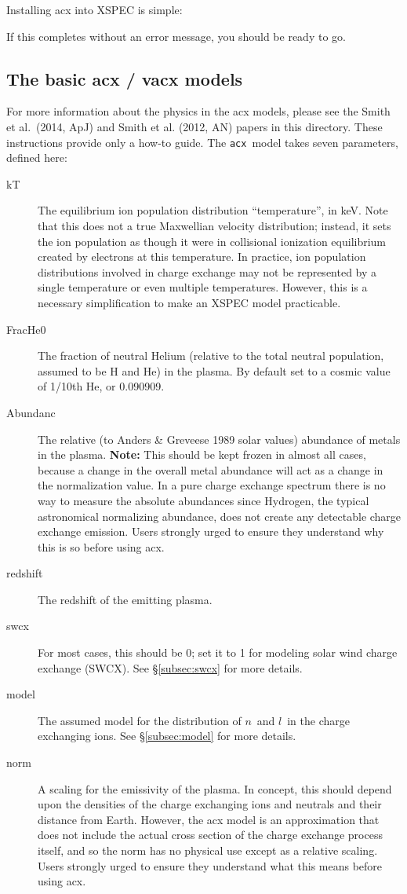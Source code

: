 \documentclass[11pt]{article}
\newcommand{\version}{1.0.2}
\begin{document}
Installing acx into XSPEC is simple:

\noindent {\tt XSPEC$>$\ lmod acx /path/to/acx-\version/xspec}

If this completes without an error message, you should be ready to go.

\subsection*{The basic acx / vacx models}

For more information about the physics in the acx models, please see
the Smith et al.\ (2014, ApJ) and Smith et al. (2012, AN) papers in
this directory.  These 
instructions provide only a how-to guide.  The {\tt acx}\ model takes
seven parameters, defined here:
\begin{description}
\item[kT] The equilibrium ion population distribution ``temperature'',
  in keV.  Note that this does not a true Maxwellian velocity
  distribution; instead, it sets the ion population as though it were
  in collisional ionization equilibrium created by electrons at this
  temperature.  In practice, ion population distributions involved in
  charge exchange may not be represented by a single temperature or
  even multiple temperatures.  However, this is a necessary
  simplification to make an XSPEC model practicable.  
\item[FracHe0] The fraction of neutral Helium (relative to the total
  neutral population, assumed to be H and He) in the plasma.  By
  default set to a cosmic value of 1/10th He, or 0.090909.
\item[Abundanc] The relative (to Anders \& Greveese 1989 solar values)
  abundance of metals in the plasma.  {\bf Note:} This should be kept
  frozen in almost all cases, because a change in the overall metal
  abundance will act as a change in the normalization value.  In a
  pure charge exchange spectrum there is no way to measure the
  absolute abundances since Hydrogen, the typical astronomical
  normalizing abundance, does not create any detectable charge
  exchange emission.  Users strongly urged to ensure they understand
  why this is so before using acx.
\item[redshift] The redshift of the emitting plasma.  
\item[swcx] For most cases, this should be 0; set it to 1 for modeling
  solar wind charge exchange (SWCX).  See \S\ref{subsec:swcx} for more details.
\item[model] The assumed model for the distribution of $n$\ and $l$\
  in the charge exchanging ions.  See \S\ref{subsec:model} for more details.
\item[norm] A scaling for the emissivity of the plasma.  In concept,
  this should depend upon the densities of the charge exchanging ions
  and neutrals and their distance from Earth.  However, the acx model
  is an approximation that does not include the actual cross section
  of the charge exchange process itself, and so the norm has no
  physical use except as a relative scaling.  Users strongly urged to
  ensure they understand what this means before using acx.
\end{description}
\end{document}
